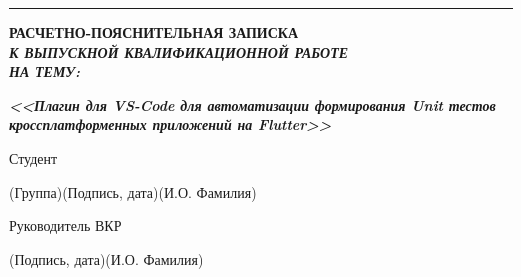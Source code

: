 \documentclass[14pt, russian]{scrartcl}
\begin{document}
\begin{titlepage}
\vspace*{-16pt}
\hspace{25pt}\rule{0.875\textwidth}{0.4pt}
 
 
\vspace{3em}
 
\begin{center}
\Large \bf{РАСЧЕТНО-ПОЯСНИТЕЛЬНАЯ ЗАПИСКА\\\textbf{\textit{К ВЫПУСКНОЙ КВАЛИФИКАЦИОННОЙ РАБОТЕ\\НА ТЕМУ:}} \\}
\end{center}

\vspace*{-6ex} 
\begin{center}
\Large{\textit{\textbf{<<Плагин для VS-Code для автоматизации формирования Unit тестов кроссплатформенных приложений на Flutter>>}}}
\end{center}
 
\vspace{\fill}
 

\newlength{\ML}

\noindent Студент \underline{\hspace{1.5cm}} \hfill \underline{\hspace{4cm}}\quad
\underline{\hspace{4cm}}

\vspace{-2.1ex}
\noindent\hspace{9ex}\scriptsize{(Группа)}\normalsize\hspace{170pt}\hspace{2ex}\scriptsize{(Подпись, дата)}\normalsize\hspace{30pt}\hspace{6ex}\scriptsize{(И.О. Фамилия)}\normalsize

\bigskip

\noindent Руководитель ВКР \hfill \underline{\hspace{4cm}}\quad
\underline{\hspace{4cm}}

\vspace{-2ex}
\noindent\hspace{13.5ex}\normalsize\hspace{170pt}\hspace{2ex}\scriptsize{(Подпись, дата)}\normalsize\hspace{30pt}\hspace{6ex}\scriptsize{(И.О. Фамилия)}\normalsize
\bigskip


\end{titlepage}
\end{document}
